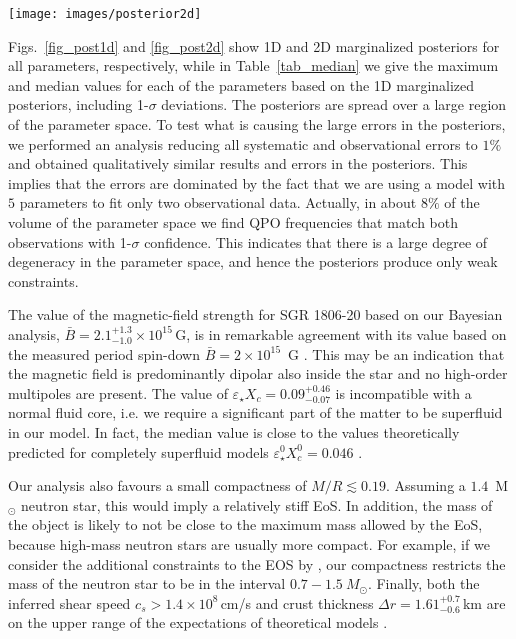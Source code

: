 \documentclass[useAMS,usenatbib]{mnras}
\begin{document}
\begin{figure*}
\texttt{[image: images/posterior2d]}
\caption{2D marginalized posteriors for all possible combinations of parameters 
(color coded) and credible intervals for $68.2\%$ (1 $\sigma$, black line), 
$95.4\%$ (2 $\sigma$, blue line) and $99.7\%$ (3 $\sigma$, orange line). 
The thick black line indicates the spin-down estimate of the dipolar 
magnetic field strength of SGR 1806-20.
}
\label{fig_post2d}
\end{figure*}

Figs.~\ref{fig_post1d} and \ref{fig_post2d} show 1D and 2D marginalized 
posteriors for all parameters, respectively, while in Table~\ref{tab_median} we 
give the maximum and median values for each of the parameters based on the 
1D marginalized posteriors, including 1-$\sigma$ deviations. 
The posteriors are spread over a large region of the parameter space. To 
test what is causing the large errors in the posteriors, we performed an 
analysis reducing all systematic and 
observational errors to $1\%$ and obtained qualitatively similar results and 
errors in the posteriors. This implies that the errors are 
dominated
by the fact that we are using a model with $5$ parameters to fit only two 
observational data. Actually, in about $8\%$ of the volume of the parameter 
space we find QPO frequencies that match both observations with 1-$\sigma$ 
confidence. This indicates that there is a large degree of degeneracy in the 
parameter space, and hence
the posteriors produce only weak constraints.



The value of the magnetic-field strength for SGR 1806-20 based on our Bayesian 
analysis, $\bar B = 2.1^{+1.3}_{-1.0}\times10^{15}\,$G, is in remarkable 
agreement with its value based on the measured period spin-down $\bar B=2 \times 
10^{15}$~G \citep{Woods2007}. This may be an indication that the magnetic field 
is predominantly dipolar also inside the star and no 
high-order multipoles are present. The value of $\varepsilon_\star 
X_c=0.09^{+0.46}_{-0.07}$ is incompatible with a normal fluid core, i.e. we 
require a significant part of the matter to be superfluid in our model. In 
fact, the median value is close to the values theoretically predicted for completely 
superfluid models $\varepsilon_\star^0 X_c^0=0.046$ \citep{Douchin2001}.

Our analysis also favours a small compactness of $M/R\lesssim0.19$. Assuming 
a $1.4$~M$_\odot$ neutron star, this would imply a relatively stiff EoS. In 
addition, the mass of the object is likely to not be close to the maximum mass 
allowed by the EoS, because high-mass neutron stars are usually more compact. 
For example, if we
consider the additional constraints to the EOS by \cite{Lattimer2014}, our 
compactness restricts the mass of the neutron star to be in the interval 
$0.7-1.5~M_\odot$. Finally, both the inferred shear speed 
$c_s>1.4\times10^8\,$cm/s and crust thickness $\Delta 
r=1.61^{+0.7}_{-0.6}\,$km are on the upper range of the expectations of 
theoretical models \citep{Steiner2009,Sotani2008}. 
\end{document}
